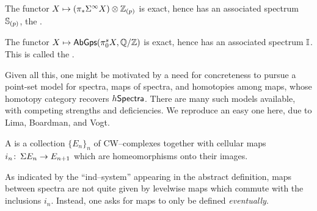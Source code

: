 \begin{example}
The functor $X \mapsto (\pi_* \Susp^\infty X) \otimes \Z_{(p)}$ is exact, hence has an associated spectrum $\S_{(p)}$, the .
\end{example}


\begin{example}
The functor $X \mapsto \CatOf{AbGps}(\pi_0^s X, \Q/\Z)$ is exact, hence has an associated spectrum $\I$.  This is called the .
\end{example}

Given all this, one might be motivated by a need for concreteness to pursue a point-set model for spectra, maps of spectra, and homotopies among maps, whose homotopy category recovers $h\CatOf{Spectra}$.
There are many such models available, with competing strengths and deficiencies.
We reproduce an easy one here, due to Lima, Boardman, and Vogt.

\begin{definition}\label{BoardmanVogtModel}
A  is a collection $\{E_n\}_n$ of CW--complexes together with cellular maps $i_n\co \Susp E_n \to E_{n+1}$ which are homeomorphisms onto their images.
\end{definition}

As indicated by the ``ind--system'' appearing in the abstract definition, maps between spectra are not quite given by levelwise maps which commute with the inclusions $i_n$.%
Instead, one asks for maps to only be defined \emph{eventually}.

